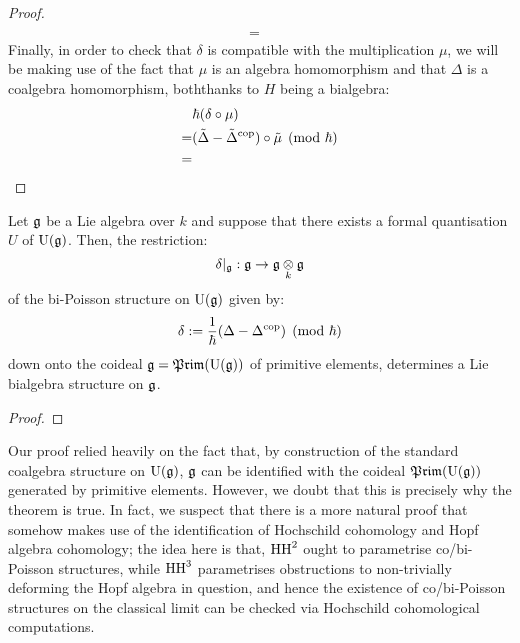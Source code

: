 \begin{proof}
$$\begin{aligned}
                                \\
                                = & 
                            \end{aligned}
                        $$
                    Finally, in order to check that $\delta$ is compatible with the multiplication $\mu$, we will be making use of the fact that $\mu$ is an algebra homomorphism and that $\Delta$ is a coalgebra homomorphism, boththanks to $H$ being a bialgebra:
                        $$
                            \begin{aligned}
                                & \hbar( \delta \circ \mu )
                                \\
                                = & (\tilde{\Delta} - \tilde{\Delta}^{\mathrm{cop}}) \circ \tilde{\mu} \pmod{\hbar}
                                \\
                                = & 
                            \end{aligned}
                        $$
                \end{proof}
            \begin{theorem} \label{theorem: lie_bialgebra_structures_from_bi_poisson_structures}
                Let $\mathfrak{g}$ be a Lie algebra over $k$ and suppose that there exists a formal quantisation $U$ of $\mathrm{U}(\mathfrak{g})$. Then, the restriction:
                    $$\delta|_{\g}: \g \to \g \tensor_k \g$$
                of the bi-Poisson structure on $\mathrm{U}(\mathfrak{g})$ given by:
                    $$\delta := \frac{1}{\hbar}(\Delta - \Delta^{\mathrm{cop}}) \pmod{\hbar}$$
                down onto the coideal $\mathfrak{g} = \mathfrak{Prim}(\mathrm{U}(\mathfrak{g}))$ of primitive elements, determines a Lie bialgebra structure on $\mathfrak{g}$.    
            \end{theorem}
                \begin{proof}
                    
                \end{proof}
            \begin{remark}
                Our proof relied heavily on the fact that, by construction of the standard coalgebra structure on $\mathrm{U}(\mathfrak{g})$, $\mathfrak{g}$ can be identified with the coideal $\mathfrak{Prim}(\mathrm{U}(\mathfrak{g}))$ generated by primitive elements. However, we doubt that this is precisely why the theorem is true. In fact, we suspect that there is a more natural proof that somehow makes use of the identification of Hochschild cohomology and Hopf algebra cohomology; the idea here is that, $\mathrm{HH}^2$ ought to parametrise co/bi-Poisson structures, while $\mathrm{HH}^3$ parametrises obstructions to non-trivially deforming the Hopf algebra in question, and hence the existence of co/bi-Poisson structures on the classical limit can be checked via Hochschild cohomological computations. 
            \end{remark}
        
